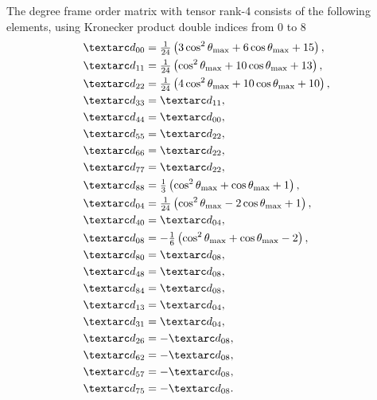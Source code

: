 The  degree frame order matrix with tensor rank-4 consists of the following elements, using Kronecker product double indices from 0 to 8
\begin{subequations}
\begin{align}
    &\FO_{00} = \tfrac{1}{24} \left( 3\cos^2\conethetamax + 6\cos\conethetamax + 15 \right), \\
    &\FO_{11} = \tfrac{1}{24} \left( \cos^2\conethetamax + 10\cos\conethetamax + 13 \right) , \\
    &\FO_{22} = \tfrac{1}{24} \left( 4\cos^2\conethetamax + 10\cos\conethetamax + 10 \right) , \\
    &\FO_{33} = \FO_{11} , \\
    &\FO_{44} = \FO_{00} , \\
    &\FO_{55} = \FO_{22} , \\
    &\FO_{66} = \FO_{22} , \\
    &\FO_{77} = \FO_{22} , \\
    &\FO_{88} = \tfrac{1}{3} \left( \cos^2\conethetamax + \cos\conethetamax + 1 \right), \\
    &\FO_{04} = \tfrac{1}{24} \left( \cos^2\conethetamax - 2\cos\conethetamax + 1 \right) , \\
    &\FO_{40} = \FO_{04} , \\
    &\FO_{08} = -\tfrac{1}{6} \left( \cos^2\conethetamax + \cos\conethetamax - 2 \right) , \\
    &\FO_{80} = \FO_{08} , \\
    &\FO_{48} = \FO_{08} , \\
    &\FO_{84} = \FO_{08} , \\
    &\FO_{13} = \FO_{04} , \\
    &\FO_{31} = \FO_{04} , \\
    &\FO_{26} = -\FO_{08} , \\
    &\FO_{62} = -\FO_{08} , \\
    &\FO_{57} = -\FO_{08} , \\
    &\FO_{75} = -\FO_{08} .
\end{align}
\end{subequations}

